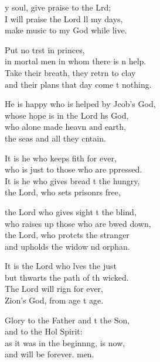 \settowidth{\versewidth}{He is happy who is helped by Jacob’s God, *}
\begin{psalmverse}%
  \begin{patverse}
y soul, give praise to the Lrd;\Flex\\
I will praise the Lord ll my days,\Med\\
make music to my God while  live.

Put no trst in princes,\Med\\
in mortal men in whom there is n help.\\
Take their breath, they retrn to clay\Med\\
and their plans that day come t nothing.

He is happy who is helped by Jcob’s God,\Med\\
whose hope is in the Lord h\pointup{\i}s God,\\
who alone made heavn and earth,\Med\\
the seas and all they cntain.

It is he who keeps fith for ever,\Med\\
who is just to those who are ppressed.\\
It is he who gives bread t the hungry,\Med\\
the Lord, who sets prisonrs free,

the Lord who gives sight t the blind,\Med\\
who raises up those who are bwed down,\\
the Lord, who protcts the stranger\Med\\
and upholds the widow nd orphan.

It is the Lord who lves the just\Med\\
but thwarts the path of th wicked.\\
The Lord will rign for ever,\Med\\
Zion’s God, from age t age.

Glory to the Father and t the Son,\Med\\
and to the Hol Spirit:\\
as it was in the beginn\pointup{\i}ng, is now,\Med\\
and will be forever. men. 
  \end{patverse}
\end{psalmverse}
